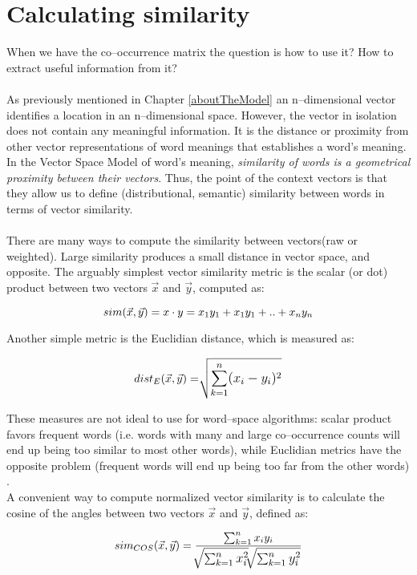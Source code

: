 \section{Calculating similarity}
When we have the co--occurrence matrix the question is how to use it? How to extract useful information from it? 
\\\\
As previously mentioned in Chapter \ref{aboutTheModel} an n--dimensional vector identifies a location in 
an n--dimensional space. However, the vector in isolation does not contain any meaningful information. It is 
the distance or proximity from other vector representations of word meanings that establishes a word's 
meaning. In the Vector Space Model of word's meaning, \textit{similarity of words is a geometrical 
proximity between their vectors}. Thus, the point of the context vectors is that they allow us to define 
(distributional, semantic) similarity between words in terms of vector similarity.
\\\\  
There are many ways to compute the similarity between vectors(raw or weighted). Large similarity 
produces a small distance in vector space, and opposite. The arguably simplest vector similarity metric is 
the scalar (or dot) product between two vectors $\vec x$ and $\vec y$, computed as:
\begin{center}
\begin{equation}
\large{
sim(\vec x,\vec y) = x \cdot y = x_{1}y_{1} + x_{1}y_{1}+ .. + x_{n}y_{n}
}
\end{equation}
\end{center}
Another simple metric is the Euclidian distance, which is measured as:
\begin{center}
\begin{equation}
\large{
dist_{E}(\vec x ,\vec y) =  \sqrt []{\sum_{k=1}^n (x_{i}-y_{i})^{2}}  
}
\end{equation}
\end{center}
These measures are not ideal to use for word--space algorithms: scalar product favors frequent words (i.e. words with many and large co--occurrence counts will end up being too similar to most other words), while Euclidian metrics have the opposite problem (frequent words will end up being too far from the other words)\cite{widdows04}  .
\\A convenient way to compute normalized vector similarity is to calculate the cosine of the angles between two vectors $\vec x$ and $\vec y$, defined as:
\begin{center}
\begin{equation}
\large{
sim_{COS}(\vec x ,\vec y) =  \frac{\sum_{k=1}^n x_{i}y_{i} }{\sqrt []{\sum_{k=1}^n x_{i}^{2}} \sqrt []{\sum_{k=1}^n y_{i}^{2}}} 
}
\end{equation}
\end{center}

